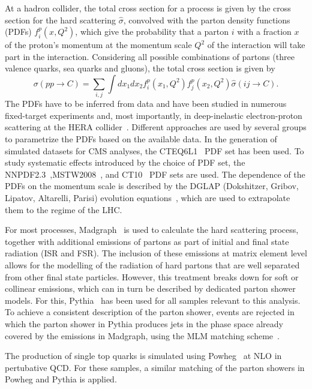 At a hadron collider, the total cross section for a process is given by the cross section for the hard scattering $\hat{\sigma}$, convolved with the parton density functions (PDFs) $f^p_i(x,Q^2)$, which give the probability that a parton $i$ with a fraction $x$ of the proton's momentum at the momentum scale $Q^2$ of the interaction will take part in the interaction. Considering all possible combinations of partons (three valence quarks, sea quarks and gluons), the total cross section is given by
\begin{equation}
\sigma (pp \rightarrow C)  = \sum\limits_{i,j} \int dx_1 dx_2 f^p_i (x_1,Q^2) f^p_j(x_2,Q^2) \hat{\sigma}(ij\rightarrow C).
\end{equation} 
The PDFs have to be inferred from data and have been studied in numerous fixed-target experiments and, most importantly, in deep-inelastic electron-proton scattering at the HERA collider~\cite{Aaron:2009aa}. Different approaches are used by several groups to parametrize the PDFs based on the available data. In the generation of simulated datasets for CMS analyses, the CTEQ6L1~\cite{Pumplin:2002vw} PDF set has been used. To study systematic effects introduced by the choice of PDF set, the NNPDF2.3~\cite{Ball:2012cx},MSTW2008~\cite{Martin:2009iq}, and CT10~\cite{Lai:2010vv} PDF sets are used. The dependence of the PDFs on the momentum scale is described by the DGLAP (Dokshitzer, Gribov, Lipatov, Altarelli, Parisi) evolution equations~\cite{Gribov,Altarelli:1977zs,Dokshitzer}, which are used to extrapolate them to the regime of the LHC. 

For most processes, Madgraph~\cite{Alwall:2011uj} is used to calculate the hard scattering process, together with additional emissions of partons as part of initial and final state radiation (ISR and FSR). The inclusion of these emissions at matrix element level allows for the modelling of the radiation of hard partons that are well separated from other final state particles. However, this treatment breaks down for soft or collinear emissions, which can in turn be described by dedicated parton shower models. For this, Pythia~\cite{Pythia} has been used for all samples relevant to this analysis. To achieve a consistent description of the parton shower, events are rejected in which the parton shower in Pythia produces jets in the phase space already covered by the emissions in Madgraph, using the MLM matching scheme~\cite{Hoche:2006ph}. 

The production of single top quarks is simulated using Powheg~\cite{Powheg,Alioli:2009je,Re:2010bp} at NLO in pertubative QCD. For these samples, a similar matching of the parton showers in Powheg and Pythia is applied.  
 
